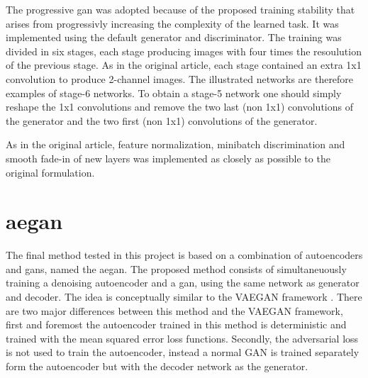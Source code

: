 The progressive \acrshort{gan} was adopted because of the proposed training stability that arises from progressivly increasing the complexity of the learned task. It was implemented using the default generator and discriminator. The training was divided in six stages, each stage producing images with four times the resoulution of the previous stage. As in the original article, each stage contained an extra 1x1 convolution to produce 2-channel images.  The illustrated networks are therefore examples of stage-6 networks. To obtain a stage-5 network one should simply reshape the 1x1 convolutions and remove the two last (non 1x1) convolutions of the generator and the two first (non 1x1) convolutions of the generator.

As in the original article, feature normalization, minibatch discrimination and smooth fade-in of new layers was implemented as closely as possible to the original formulation.



\section{\acrlong{aegan}}
The final method tested in this project is based on a combination of autoencoders and \acrshort{gans}, named the \acrfull{aegan}. The proposed method consists of simultaneuously training a denoising autoencoder and a \acrshort{gan}, using the same network as generator and decoder. The idea is conceptually similar to the VAEGAN framework \parencite{LarsenSW15autoencodingbeyond}. There are two major differences between this method and the VAEGAN framework, first and foremost the autoencoder trained in this method is deterministic and trained with the mean squared error loss functions. Secondly, the adversarial loss is not used to train the autoencoder, instead a normal GAN is trained separately form the autoencoder but with the decoder network as the generator. 


